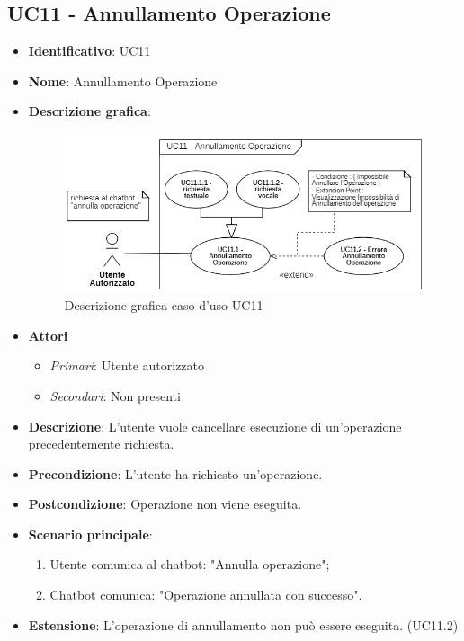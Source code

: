 \subsection{UC11 - Annullamento Operazione }
\begin{itemize}
	\item \textbf{Identificativo}: UC11
	\item \textbf{Nome}: Annullamento Operazione
  \item \textbf{Descrizione grafica}:

\begin{figure}[h]
    \includegraphics[scale=1.20]{images/UC11.png} 
    \caption{Descrizione grafica caso d'uso UC11}
\end{figure}

	\item \textbf{Attori}
	\begin{itemize} 
		\item \textit{Primari}: Utente autorizzato
		\item \textit{Secondari}: Non presenti
	\end{itemize}
	\item \textbf{Descrizione}: L'utente vuole cancellare esecuzione di un'operazione precedentemente richiesta.
	\item \textbf{Precondizione}: L'utente ha richiesto un'operazione.
	\item \textbf{Postcondizione}: Operazione non viene eseguita.
	\item \textbf{Scenario principale}: \begin{enumerate}
		\item Utente comunica al chatbot: "Annulla operazione";
		\item Chatbot comunica: "Operazione annullata con successo".
	\end{enumerate}
  \item \textbf{Estensione}: L'operazione di annullamento non può essere eseguita. (UC11.2)
\end{itemize}

